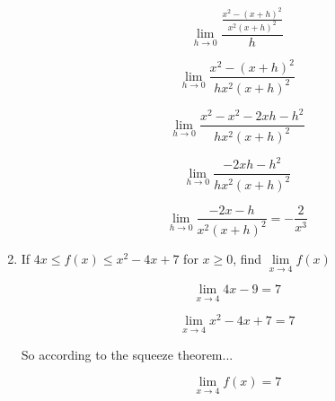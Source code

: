 \documentclass{article}
\begin{document}
\begin{enumerate}
			$$\lim \limits _{h \to 0} \frac{\frac{x^2 - (x+h)^2}{x^2(x+h)^2}}{h}$$

			$$\lim \limits _{h \to 0} \frac{x^2 - (x+h)^2}{hx^2(x+h)^2}$$

			$$\lim \limits _{h \to 0} \frac{x^2-x^2 -2xh - h^2}{hx^2(x+h)^2}$$

			$$\lim \limits _{h \to 0} \frac{-2xh-h^2}{hx^2(x+h)^2}$$

			$$\lim \limits _{h \to 0} \frac{-2x-h}{x^2(x+h)^2} = -\frac{2}{x^3}$$

		\item If $4x \leq f(x) \leq x^2 - 4x + 7$ for $x \geq 0$, find $\lim \limits _{x \to 4} f(x)$

			$$\lim \limits _{x \to 4} 4x - 9 = 7$$

			$$\lim \limits _{x \to 4} x^2 - 4x + 7 = 7$$

			So according to the squeeze theorem...

			$$\lim \limits _{x \to 4} f(x) = 7$$
		
	\end{enumerate}
\end{document}
